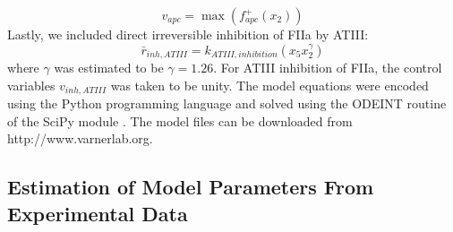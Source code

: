 \documentclass[processes,article,received,moreauthors,pdftex,12pt,a4paper]{mdpi}
\begin{document}
\begin{equation}
	v_{apc} = \max\left(f_{apc}^{+}\left(x_{2}\right)\right)
\end{equation}
Lastly, we included direct irreversible inhibition of FIIa by ATIII:
\begin{equation}
	\bar{r}_{inh,ATIII} = k_{ATIII,inhibition}\left(x_{5}x_{2}^{\gamma}\right)
\end{equation}where $\gamma$ was estimated to be $\gamma = 1.26$. For ATIII inhibition of FIIa, the control variables $v_{inh,ATIII}$ was taken to be unity.
The model equations were encoded using the Python programming language and solved using the ODEINT routine of the SciPy module \citep{SCIPY}.
The model files can be downloaded from http://www.varnerlab.org.


\subsection{Estimation of Model Parameters From Experimental Data}
\end{document}
